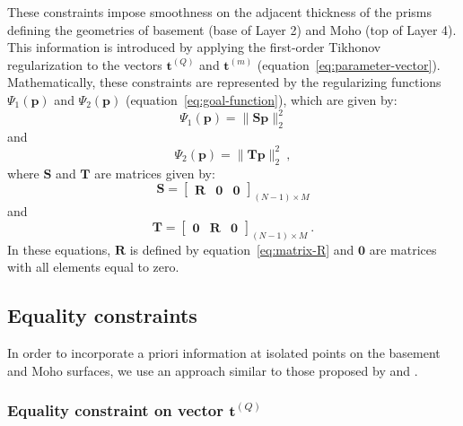 \documentclass[manuscript,revised]{geophysics}
\begin{document}
These constraints impose smoothness on the adjacent thickness of the prisms defining
the geometries of basement (base of Layer 2) and Moho (top of Layer 4). 
This information is introduced by applying the first-order Tikhonov regularization
\citep{aster-etal2005} to the vectors $\mathbf{t}^{(Q)}$ and $\mathbf{t}^{(m)}$ 
(equation~\ref{eq:parameter-vector}). 
Mathematically, these constraints are represented by the regularizing functions
$\Psi_{1}(\mathbf{p})$ and $\Psi_{2}(\mathbf{p})$ (equation~\ref{eq:goal-function}),
which are given by:
\begin{equation}
\Psi_{1}(\mathbf{p}) = \| \mathbf{S}\mathbf{p} \|_{2}^{2}
\label{eq:smootheness-contraint-basement}
\end{equation}
and 
\begin{equation}
\Psi_{2}(\mathbf{p}) = \| \mathbf{T}\mathbf{p} \|_{2}^{2} \: ,
\label{eq:smootheness-contraint-moho}
\end{equation}
where $\mathbf{S}$ and $\mathbf{T}$ are matrices given by:
\begin{equation}
\mathbf{S} = \begin{bmatrix}
\mathbf{R} & \mathbf{0} & \mathbf{0}
\end{bmatrix}_{\left( N-1 \right) \times M}
\label{eq:matrix-S}
\end{equation}
and
\begin{equation}
\mathbf{T} = \begin{bmatrix}
\mathbf{0} & \mathbf{R} & \mathbf{0}
\end{bmatrix}_{\left( N-1 \right) \times M} \: .
\label{eq:matrix-T}
\end{equation}
In these equations, $\mathbf{R}$ is defined by equation~\ref{eq:matrix-R} 
and $\mathbf{0}$ are matrices with all elements equal to zero.


\subsection{Equality constraints}

In order to incorporate a priori information at isolated points on the basement
and Moho surfaces, we use an approach similar to those proposed by
\citet{barbosa-etal1997} and \citet{barbosa-etal1999b}. 

\subsubsection*{Equality constraint on vector $\mathbf{t}^{(Q)}$}
\end{document}
